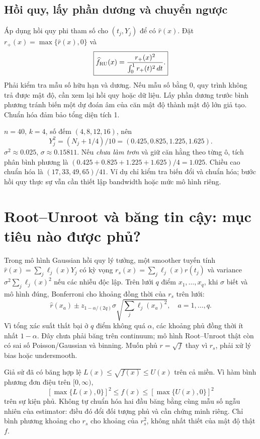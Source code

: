 \subsection{Hồi quy, lấy phần dương và chuyển ngược}
Áp dụng hồi quy phi tham số cho $(t_j,Y_j)$ để có $\widehat r(x)$.
Đặt $r_+(x)=\max\{\widehat r(x),0\}$ và
\[
\boxed{\widehat f_{\rm RU}(x)=
\frac{r_+(x)^2}{\int_0^1r_+(t)^2\,dt}.}
\]
Phải kiểm tra mẫu số hữu hạn và dương. Nếu mẫu số bằng 0, quy trình
không trả được mật độ, cần xem lại hồi quy hoặc dữ liệu.
Lấy phần dương trước bình phương tránh biến một dự đoán âm của căn mật
độ thành mật độ lớn giả tạo. Chuẩn hóa đảm bảo tổng diện tích 1.

\begin{example}
$n=40$, $k=4$, số đếm $(4,8,12,16)$, nên
\[
Y_j^2=(N_j+1/4)/10=(0.425,0.825,1.225,1.625).
\]
$\sigma^2\approx0.025$, $\sigma\approx0.15811$.
Nếu \emph{chưa làm trơn} và giữ căn hằng theo từng ô, tích phân bình
phương là $(0.425+0.825+1.225+1.625)/4=1.025$.
Chiều cao chuẩn hóa là $(17,33,49,65)/41$.
Ví dụ chỉ kiểm tra biến đổi và chuẩn hóa; bước hồi quy thực sự vẫn cần
thiết lập bandwidth hoặc mức mô hình riêng.
\end{example}

\section{Root--Unroot và băng tin cậy: mục tiêu nào được phủ?}
Trong mô hình Gaussian hồi quy lý tưởng, một smoother tuyến tính
$\widehat r(x)=\sum_j\ell_j(x)Y_j$ có kỳ vọng
$r_s(x)=\sum_j\ell_j(x)r(t_j)$ và variance
$\sigma^2\sum_j\ell_j(x)^2$ nếu các nhiễu độc lập.
Trên lưới $q$ điểm $x_1,\ldots,x_q$, khi $\sigma$ biết và mô hình đúng,
Bonferroni cho khoảng đồng thời của $r_s$ trên lưới:
\[
\widehat r(x_a)\pm z_{1-\alpha/(2q)}\sigma
\sqrt{\sum_j\ell_j(x_a)^2},\quad a=1,\ldots,q.
\]
Vì tổng xác suất thất bại ở $q$ điểm không quá $\alpha$, các khoảng
phủ đồng thời ít nhất $1-\alpha$. Đây chưa phải băng trên continuum;
mô hình Root--Unroot thật còn có sai số Poisson/Gaussian và binning.
Muốn phủ $r=\sqrt f$ thay vì $r_s$, phải xử lý bias hoặc undersmooth.

Giả sử đã có băng hợp lệ $L(x)\leq\sqrt{f(x)}\leq U(x)$ trên cả miền.
Vì hàm bình phương đơn điệu trên $[0,\infty)$,
\[
[\max\{L(x),0\}]^2\leq f(x)\leq[\max\{U(x),0\}]^2
\]
trên sự kiện phủ. Không tự chuẩn hóa hai đầu băng bằng cùng mẫu số
ngẫu nhiên của estimator: điều đó đổi đối tượng phủ và cần chứng minh
riêng. Chỉ bình phương khoảng cho $r_s$ cho khoảng của $r_s^2$, không
nhất thiết của mật độ thật $f$.

